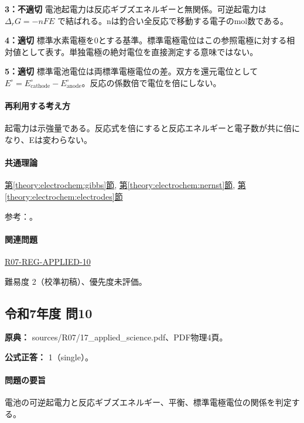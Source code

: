 \noindent\textbf{3：不適切} 電池起電力は反応ギブズエネルギーと無関係。可逆起電力は \(\Delta_rG=-nFE\) で結ばれる。nは釣合い全反応で移動する電子のmol数である。\par

\noindent\textbf{4：適切} 標準水素電極を0とする基準。標準電極電位はこの参照電極に対する相対値として表す。単独電極の絶対電位を直接測定する意味ではない。\par

\noindent\textbf{5：適切} 標準電池電位は両標準電極電位の差。双方を還元電位として \(E^\circ=E^\circ_{\mathrm{cathode}}-E^\circ_{\mathrm{anode}}\)。反応の係数倍で電位を倍にしない。\par

\paragraph{再利用する考え方} 起電力は示強量である。反応式を倍にすると反応エネルギーと電子数が共に倍になり、Eは変わらない。

\paragraph{共通理論} \hyperref[theory:electrochem:gibbs]{第\ref*{theory:electrochem:gibbs}節}, \hyperref[theory:electrochem:nernst]{第\ref*{theory:electrochem:nernst}節}, \hyperref[theory:electrochem:electrodes]{第\ref*{theory:electrochem:electrodes}節}

\par 参考：\cite{openstax_cell_gibbs,mit_redox2014}。

\paragraph{関連問題} \hyperref[q:r07-reg-applied-10]{R07-REG-APPLIED-10}

\par 難易度 2（校準初稿）、優先度未評価。

\subsection{令和7年度 問10}
\label{q:r07-reg-applied-10}

\noindent\textbf{原典：} sources/R07/17\_applied\_science.pdf、PDF物理4頁。

\textbf{公式正答：} 1（single）。

\paragraph{問題の要旨} 電池の可逆起電力と反応ギブズエネルギー、平衡、標準電極電位の関係を判定する。

